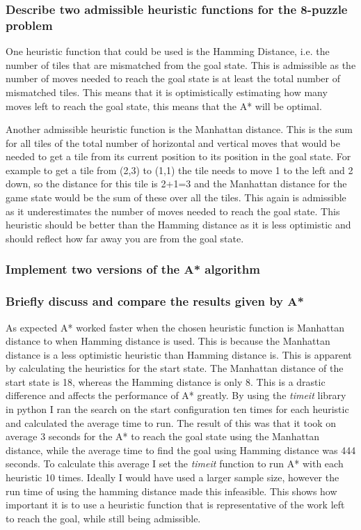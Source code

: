 \documentclass[11pt,a4paper,twoside]{article}
\begin{document}
    \subsubsection{Describe two admissible heuristic functions for the 8-puzzle problem}
    One heuristic function that could be used is the Hamming Distance, i.e. the number of tiles that 
    are mismatched from the goal state. This is admissible as the number of moves needed to reach 
    the goal state is at least the total number of mismatched tiles. This means that it is optimistically 
    estimating how many moves left to reach the goal state, this means that the A* will be optimal.
    
    Another admissible heuristic function is the Manhattan distance. This is the sum for all tiles of 
    the total number of horizontal and vertical moves that would be needed to get a tile from its 
    current position to its position in the goal state. For example to get a tile from (2,3) to (1,1) the 
    tile needs to move 1 to the left and 2 down, so the distance for this tile is 2+1=3 and the Manhattan 
    distance for the game state would be the sum of these over all the tiles. This again is admissible 
    as it underestimates the number of moves needed to reach the goal state. This heuristic should 
    be better than the Hamming distance as it is less optimistic and should reflect how far away you 
    are from the goal state.
    
    \subsubsection{Implement two versions of the A* algorithm}
    
    
    \subsubsection{Briefly discuss and compare the results given by A*}
    As expected A* worked faster when the chosen heuristic function is Manhattan distance to when
    Hamming distance is used. This is because the Manhattan distance is a less optimistic heuristic 
    than Hamming distance is. This is apparent by calculating the heuristics for the start state. The Manhattan 
    distance of the start state is 18, whereas the Hamming distance is only 8. This is a drastic difference and
    affects the performance of A* greatly. By using the \textit{timeit} library in python I ran the search on the start 
    configuration ten times for each heuristic and calculated the average time to run. The result of this was 
    that it took on average 3 seconds for the A* to reach the goal state using the Manhattan distance, while 
    the average time to find the goal using Hamming distance was 444 seconds. To calculate this average I set the 
    \textit{timeit} function to run A* with each heuristic 10 times. Ideally I would have used a larger sample size,
    however the run time of using the hamming distance made this infeasible. This shows how important it
    is to use a heuristic function that is representative of the work left to reach the goal, while still being 
    admissible.
    
\end{document}
